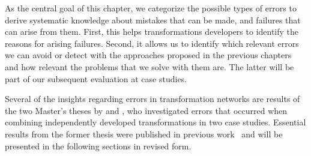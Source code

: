 
As the central goal of this chapter, we categorize the possible types of errors to derive systematic knowledge about mistakes that can be made, and failures that can arise from them.
First, this helps transformations developers to identify the reasons for arising failures.
Second, it allows us to identify which relevant errors we can avoid or detect with the approaches proposed in the previous chapters and how relevant the problems that we solve with them are.
The latter will be part of our subsequent evaluation at case studies.

Several of the insights regarding errors in transformation networks are results of the two Master's theses by  and , who investigated errors that occurred when combining independently developed transformations in two case studies.
Essential results from the former thesis were published in previous work~ and will be presented in the following sections in revised form.





